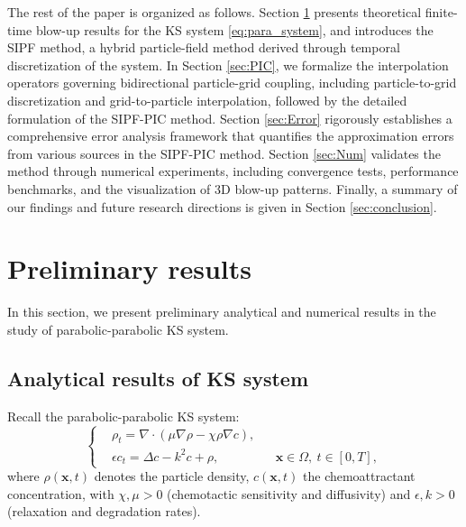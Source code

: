 \documentclass[review,onefignum,onetabnum]{siamart250211}
\begin{document}
The rest of the paper is organized as follows. Section \ref{sec:num_method} presents theoretical finite-time blow-up results for the KS system \eqref{eq:para_system}, and introduces the SIPF method, a hybrid particle-field method derived through temporal discretization of the system. In Section \ref{sec:PIC}, we formalize the interpolation operators governing bidirectional particle-grid coupling, including particle-to-grid discretization and grid-to-particle interpolation, followed by the detailed formulation of the SIPF-PIC method. Section \ref{sec:Error} rigorously establishes a comprehensive error analysis framework that quantifies the approximation errors from various sources in the SIPF-PIC method. Section \ref{sec:Num} validates the method through numerical experiments, including convergence tests, performance benchmarks, and the visualization of 3D blow-up patterns. Finally, a summary of our findings and future research directions is given in Section \ref{sec:conclusion}.
 

\section{Preliminary results}
\label{sec:num_method}
In this section, we present preliminary analytical and numerical results in the study of parabolic-parabolic KS system.
\subsection{Analytical results of KS system}\label{subsec:review}
Recall the parabolic-parabolic KS system:
\begin{equation}
\left\{
\begin{aligned}
&\rho_t = \nabla \cdot \left( \mu \nabla\rho - \chi \rho \nabla c \right), \\
&\epsilon c_t = \Delta c - k^2 c + \rho, && \mathbf{x} \in \Omega,\ t \in [0,T],
\end{aligned}
\right.
\label{eq:system}
\end{equation}
where \( \rho(\mathbf{x},t) \) denotes the particle density, \( c(\mathbf{x},t) \) the chemoattractant concentration, with \( \chi, \mu > 0 \) (chemotactic sensitivity and diffusivity) and \( \epsilon, k > 0 \) (relaxation and degradation rates).
\end{document}
